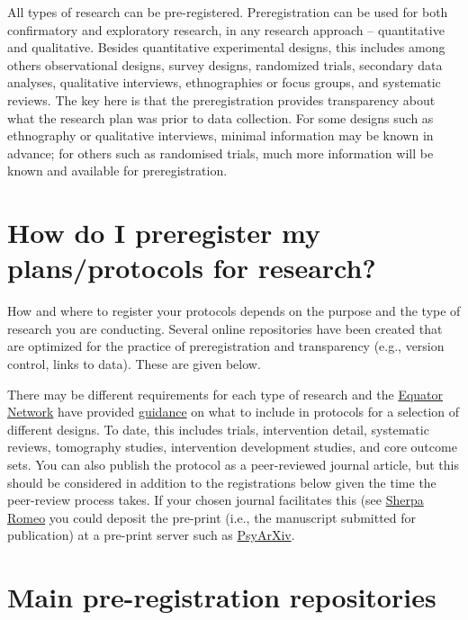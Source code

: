 \documentclass[
  letterpaper,
  DIV=11,
  numbers=noendperiod]{scrreprt}
\begin{document}
All types of research can be pre-registered. Preregistration can be used
for both confirmatory and exploratory research, in any research approach
-- quantitative and qualitative. Besides quantitative experimental
designs, this includes among others observational designs, survey
designs, randomized trials, secondary data analyses, qualitative
interviews, ethnographies or focus groups, and systematic reviews. The
key here is that the preregistration provides transparency about what
the research plan was prior to data collection. For some designs such as
ethnography or qualitative interviews, minimal information may be known
in advance; for others such as randomised trials, much more information
will be known and available for preregistration.~

\hypertarget{how-do-i-preregister-my-plansprotocols-for-research}{%
\section{How do I preregister my plans/protocols for
research?~}\label{how-do-i-preregister-my-plansprotocols-for-research}}

How and where to register your protocols depends on the purpose and the
type of research you are conducting. Several online repositories have
been created that are optimized for the practice of preregistration and
transparency (e.g., version control, links to data). These are given
below.~

There may be different requirements for each type of research and the
\href{https://www.equator-network.org/}{Equator Network} have provided
\href{https://www.equator-network.org/?post_type=eq_guidelines\&eq_guidelines_study_design=study-protocols\&eq_guidelines_clinical_specialty=0\&eq_guidelines_report_section=0\&s=+}{guidance}
on what to include in protocols for a selection of different designs. To
date, this includes trials, intervention detail, systematic reviews,
tomography studies, intervention development studies, and core outcome
sets. You can also publish the protocol as a peer-reviewed journal
article, but this should be considered in addition to the registrations
below given the time the peer-review process takes. If your chosen
journal facilitates this (see
\href{https://v2.sherpa.ac.uk/romeo/}{Sherpa Romeo} you could deposit
the pre-print (i.e., the manuscript submitted for publication) at a
pre-print server such as \href{https://psyarxiv.com/}{PsyArXiv}.~

\hypertarget{main-pre-registration-repositories}{%
\section{Main pre-registration
repositories~}\label{main-pre-registration-repositories}}
\end{document}
